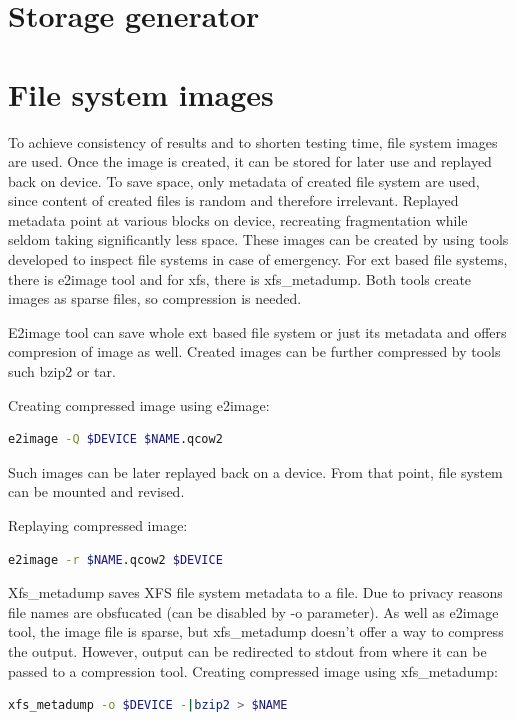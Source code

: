 \documentclass[
  color, %
  table, %
  lof,   %
  lot,   %
]{fithesis3}
\begin{document}
\section{Storage generator}
\section{File system images}
To achieve consistency of results and to shorten testing time, file system images are used. Once the image is created, it can be stored for later use and replayed back on device. To save space, only metadata of created file system are used, since content of created files is random and therefore irrelevant. Replayed metadata point at various blocks on device, recreating fragmentation while seldom taking significantly less space. These images can be created by using tools developed to inspect file systems in case of emergency. For ext based file systems, there is e2image tool and for xfs, there is xfs\_metadump. Both tools create images as sparse files, so compression is needed.

E2image tool can save whole ext based file system or just its metadata and offers compresion of image as well. Created images can be further compressed by tools such bzip2 or tar.

\noindent Creating compressed image using e2image:
\begin{lstlisting}[language=bash]
  e2image -Q $DEVICE $NAME.qcow2
\end{lstlisting}

\noindent Such images can be later replayed back on a device. From that point, file system can be mounted and revised.

\noindent Replaying compressed image:
\begin{lstlisting}[language=bash]
  e2image -r $NAME.qcow2 $DEVICE
\end{lstlisting}

Xfs\_metadump saves XFS file system metadata to a file. Due to privacy reasons file names are obsfucated (can be disabled by -o parameter). As well as e2image tool, the image file is sparse, but xfs\_metadump doesn't offer a way to compress the output. However, output can be redirected to stdout from where it can be passed to a compression tool. Creating compressed image using xfs\_metadump:

\begin{lstlisting}[language=bash]
  xfs_metadump -o $DEVICE -|bzip2 > $NAME
\end{lstlisting}
\end{document}
